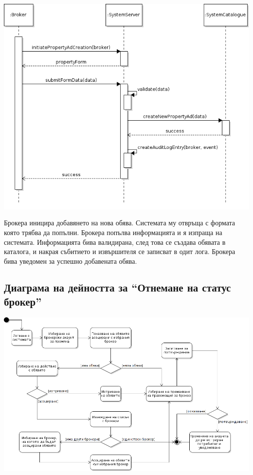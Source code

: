 \documentclass[a4paper]{article}
\begin{document}
\begin{center}
\includegraphics[scale=0.6,keepaspectratio=true]{uml09}
\end{center}

Брокера иницира добавянето на нова обява. Системата му отвръща с формата която
трябва да попълни. Брокера попълва информацията и я изпраща на системата.
Информацията бива валидирана, след това се създава обявата в каталога, и
накрая събитието и извършителя се записват в одит лога. Брокера бива уведомен
за успешно добавената обява.

\clearpage
\subsection{Диаграма на дейността за ``Отнемане на статус брокер''} %
\begin{center}
\includegraphics[scale=0.54,keepaspectratio=true]{uml10}
\end{center}
\end{document}

